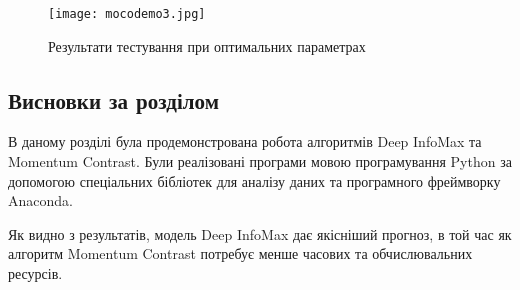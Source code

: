 \begin{figure}[h!]
  \texttt{[image: mocodemo3.jpg]}
  \caption{Результати тестування при оптимальних параметрах}
  \label{fig:mocodemo3}
\end{figure}

\newpage

\subsection{Висновки за розділом}

В даному розділі була продемонстрована робота алгоритмів Deep InfoMax та Momentum Contrast. Були реалізовані програми мовою програмування Python за допомогою спеціальних бібліотек для аналізу даних та програмного фреймворку Anaconda. 

Як видно з результатів, модель Deep InfoMax дає якісніший прогноз, в той час як алгоритм Momentum Contrast потребує менше часових та обчислювальних ресурсів.
